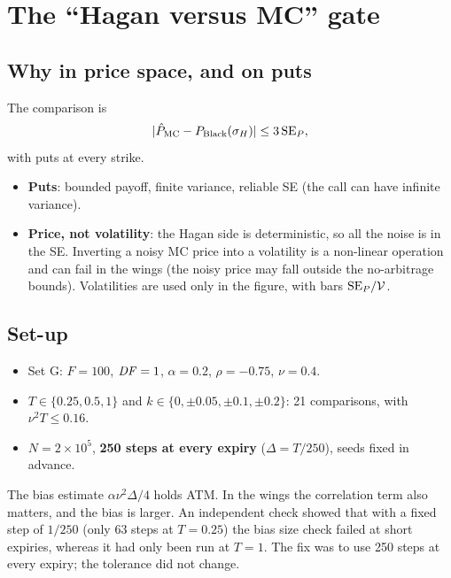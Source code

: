 \section{The ``Hagan versus MC'' gate}
\subsection{Why in price space, and on puts}
The comparison is
\[
|\hat P_{\text{MC}}-P_{\text{Black}}(\sigma_H)|\le3\,\mathrm{SE}_P,
\]
with puts at every strike.
\begin{itemize}
\item \textbf{Puts}: bounded payoff, finite variance, reliable SE (the call can have infinite variance).
\item \textbf{Price, not volatility}: the Hagan side is deterministic, so all the noise is in the SE. Inverting a noisy
MC price into a volatility is a non-linear operation and can fail in the wings (the noisy price may fall outside the
no-arbitrage bounds). Volatilities are used only in the figure, with bars $\mathrm{SE}_P/\mathcal{V}$.
\end{itemize}

\subsection{Set-up}
\begin{itemize}
\item Set G: $F=100$, $\mathit{DF}=1$, $\alpha=0.2$, $\rho=-0.75$, $\nu=0.4$.
\item $T\in\{0.25,0.5,1\}$ and $k\in\{0,\pm0.05,\pm0.1,\pm0.2\}$: 21 comparisons, with $\nu^2T\le0.16$.
\item $N=2\times10^5$, \textbf{250 steps at every expiry} ($\Delta=T/250$), seeds fixed in advance.
\end{itemize}

\begin{perche}[title={Why 250 steps at every expiry, and not $\Delta=1/250$}]
The bias estimate $\alpha\nu^2\Delta/4$ holds ATM. In the wings the correlation term also matters, and the bias is
larger. An independent check showed that with a fixed step of $1/250$ (only 63 steps at $T=0.25$) the bias size check
failed at short expiries, whereas it had only been run at $T=1$. The fix was to use 250 steps at every expiry; the
tolerance did not change.
\end{perche}

